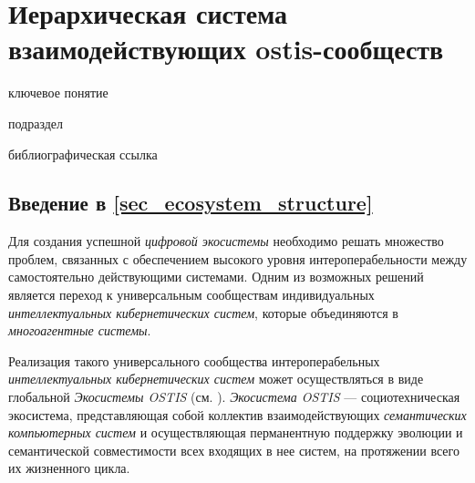 \section{Иерархическая система взаимодействующих ostis-сообществ}
{\label{sec_ecosystem_structure}} 

\begin{SCn}


\begin{scnrelfromlist}{ключевое понятие}
\end{scnrelfromlist}

\begin{scnrelfromlist}{подраздел}
\end{scnrelfromlist}


\bigskip
\begin{scnrelfromlist}{библиографическая ссылка}
\end{scnrelfromlist}

\end{SCn}

\subsection*{Введение в \ref{sec_ecosystem_structure}}
Для создания успешной \textit{цифровой экосистемы} необходимо решать множество проблем, связанных с обеспечением высокого уровня интероперабельности между самостоятельно действующими системами. Одним из возможных решений является переход к универсальным сообществам индивидуальных \textit{интеллектуальных кибернетических систем}, которые объединяются в \textit{многоагентные системы}.

Реализация такого универсального сообщества интероперабельных \textit{интеллектуальных кибернетических систем} может осуществляться в виде глобальной \textit{Экосистемы OSTIS} (см. ). 
\textit{Экосистема OSTIS} --- социотехническая экосистема, представляющая собой коллектив взаимодействующих \textit{семантических компьютерных систем} и осуществляющая перманентную поддержку эволюции и семантической совместимости всех входящих в нее систем, на протяжении всего их жизненного цикла. 

